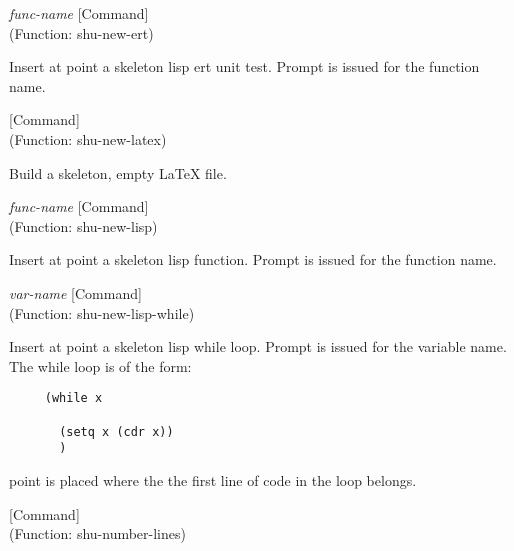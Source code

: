 \vspace{1em}
\noindent
{}
\usebox{\funcname}\emph{func-name}
 \hfill [Command]\\%
 (Function: shu-new-ert)

\begin{doc-string}
Insert at point a skeleton lisp ert unit test.  Prompt is issued for the
function name.
\end{doc-string}

\vspace{1em}
\noindent
{}
\usebox{\funcname}
 \hfill [Command]\\%
 (Function: shu-new-latex)

\begin{doc-string}
Build a skeleton, empty LaTeX file.
\end{doc-string}

\vspace{1em}
\noindent
{}
\usebox{\funcname}\emph{func-name}
 \hfill [Command]\\%
 (Function: shu-new-lisp)

\begin{doc-string}
Insert at point a skeleton lisp function.  Prompt is issued for the function
name.
\end{doc-string}

\vspace{1em}
\noindent
{}
\usebox{\funcname}\emph{var-name}
 \hfill [Command]\\%
 (Function: shu-new-lisp-while)

\begin{doc-string}
Insert at point a skeleton lisp while loop.  Prompt is issued for the
variable name.  The while loop is of the form:

\small{\begin{verbatim}
     (while x

       (setq x (cdr x))
       )
\end{verbatim}}
point is placed where the the first line of code in the loop belongs.
\end{doc-string}

\vspace{1em}
\noindent
{}
\usebox{\funcname}
 \hfill [Command]\\%
 (Function: shu-number-lines)

